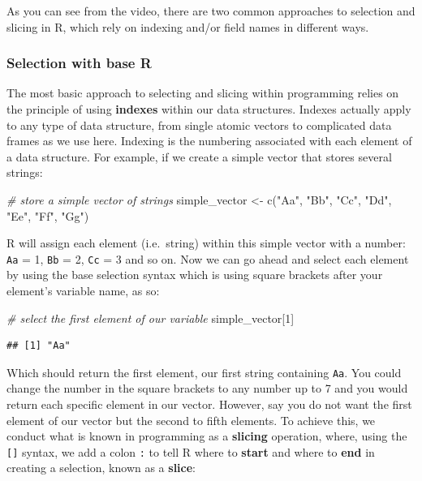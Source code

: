 \documentclass[
]{book}
\newenvironment{Shaded}{\begin{snugshade}}{\end{snugshade}}
\newcommand{\CommentTok}[1]{\textcolor[rgb]{0.56,0.35,0.01}{\textit{#1}}}
\newcommand{\DecValTok}[1]{\textcolor[rgb]{0.00,0.00,0.81}{#1}}
\newcommand{\FunctionTok}[1]{\textcolor[rgb]{0.00,0.00,0.00}{#1}}
\newcommand{\NormalTok}[1]{#1}
\newcommand{\OtherTok}[1]{\textcolor[rgb]{0.56,0.35,0.01}{#1}}
\newcommand{\StringTok}[1]{\textcolor[rgb]{0.31,0.60,0.02}{#1}}
\begin{document}
As you can see from the video, there are two common approaches to selection and slicing in R, which rely on indexing and/or field names in different ways.

\hypertarget{selection-with-base-r}{%
\subsubsection{Selection with base R}\label{selection-with-base-r}}

The most basic approach to selecting and slicing within programming relies on the principle of using \textbf{indexes} within our data structures. Indexes actually apply to any type of data structure, from single atomic vectors to complicated data frames as we use here. Indexing is the numbering associated with each element of a data structure. For example, if we create a simple vector that stores several strings:

\begin{Shaded}
\begin{Highlighting}[]
\CommentTok{\# store a simple vector of strings}
\NormalTok{simple\_vector }\OtherTok{\textless{}{-}} \FunctionTok{c}\NormalTok{(}\StringTok{"Aa"}\NormalTok{, }\StringTok{"Bb"}\NormalTok{, }\StringTok{"Cc"}\NormalTok{, }\StringTok{"Dd"}\NormalTok{, }\StringTok{"Ee"}\NormalTok{, }\StringTok{"Ff"}\NormalTok{, }\StringTok{"Gg"}\NormalTok{)}
\end{Highlighting}
\end{Shaded}

R will assign each element (i.e.~string) within this simple vector with a number: \texttt{Aa} = 1, \texttt{Bb} = 2, \texttt{Cc} = 3 and so on. Now we can go ahead and select each element by using the base selection syntax which is using square brackets after your element's variable name, as so:

\begin{Shaded}
\begin{Highlighting}[]
\CommentTok{\# select the first element of our variable}
\NormalTok{simple\_vector[}\DecValTok{1}\NormalTok{]}
\end{Highlighting}
\end{Shaded}

\begin{verbatim}
## [1] "Aa"
\end{verbatim}

Which should return the first element, our first string containing \texttt{Aa}. You could change the number in the square brackets to any number up to 7 and you would return each specific element in our vector. However, say you do not want the first element of our vector but the second to fifth elements. To achieve this, we conduct what is known in programming as a \textbf{slicing} operation, where, using the \texttt{{[}{]}} syntax, we add a colon \texttt{:} to tell R where to \textbf{start} and where to \textbf{end} in creating a selection, known as a \textbf{slice}:
\end{document}
